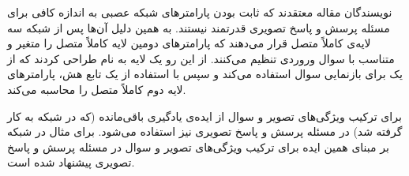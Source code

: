 نویسندگان مقاله 
\cite{noh2016image}
معتقدند که ثابت بودن پارامترهای شبکه عصبی به اندازه کافی برای مسئله پرسش و پاسخ تصویری قدرتمند نیستند. به همین دلیل آن‌ها پس از شبکه 
سه لایه‌ی کاملاً متصل قرار می‌دهند که پارامترهای دومین لایه کاملاً متصل را متغیر و متناسب با سوال وروردی تنظیم می‌کنند. از این رو یک لایه به نام
طراحی کردند که از یک 
برای بازنمایی سوال استفاده می‌کند و سپس با استفاده از یک تابع هش، پارامتر‌های لایه دوم کاملاً متصل را محاسبه می‌کند.

برای ترکیب ویژگی‌های تصویر و سوال از ایده‌ی یادگیری باقی‌مانده
(که در شبکه‌
به کار گرفته شد) در مسئله پرسش و پاسخ تصویری نیز استفاده می‌شود. برای مثال در 
\cite{kim2016multimodal}
شبکه 
بر مبنای همین ایده برای ترکیب ویژگی‌های تصویر و سوال در مسئله پرسش و پاسخ تصویری پیشنهاد شده است.

